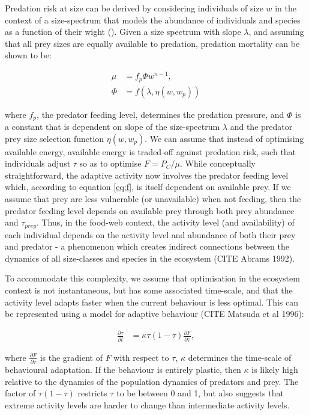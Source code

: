 \documentclass{article}\usepackage[]{graphicx}\usepackage[]{color}
\begin{document}
Predation risk at size can be derived by considering individuals of size $w$ in the context of a size-spectrum that models the abundance of individuals and species as a function of their wight (\cite{andersen_how_2009}). Given a size spectrum with slope $\lambda$, and assuming that all prey sizes are equally available to predation, predation mortality can be shown to be:

\begin{align}
\mu &= f_p \Phi w^{n-1},\\
\Phi &= f(\lambda,\eta(w,w_p))
\end{align}

where $f_p$, the predator feeding level, determines the predation pressure, and $\Phi$ is a constant that is dependent on slope of the size-spectrum $\lambda$ and the predator prey size selection function $\eta(w,w_p)$. We can assume that instead of optimising available energy, available energy is traded-off against predation risk, such that individuals adjust $\tau$ so as to optimise $F = P_C/\mu$. While conceptually straightforward, the adaptive activity now involves the predator feeding level which, according to equation \ref{eq:f}, is itself dependent on available prey. If we assume that prey are less vulnerable (or unavailable) when not feeding, then the predator feeding level depends on available prey through both prey abundance and $\tau_{prey}$. Thus, in the food-web context, the activity level (and availability) of each individual depends on the activity level and abundance of both their prey and predator - a phenomenon which creates indirect connections between the dynamics of all size-classes and species in the ecosystem (CITE Abrams 1992). 

To accommodate this complexity, we assume that optimisation in the ecosystem context is not instantaneous, but has some associated time-scale, and that the activity level adapts faster when the current behaviour is less optimal. This can be represented using a model for adaptive behaviour (CITE Matsuda et al 1996):

\begin{align}
\frac{\partial \tau}{\partial t} &= \kappa \tau(1-\tau) \frac{\partial F}{\partial \tau},
\label{eq:dtau}
\end{align}

where $\frac{\partial F}{\partial \tau}$ is the gradient of $F$ with respect to $\tau$, $\kappa$ determines the time-scale of behavioural adaptation. If the behaviour is entirely plastic, then $\kappa$ is likely high relative to the dynamics of the population dynamics of predators and prey. The factor of $\tau(1-\tau)$ restricts $\tau$ to be between 0 and 1, but also suggests that extreme activity levels are harder to change than intermediate activity levels.
\end{document}
